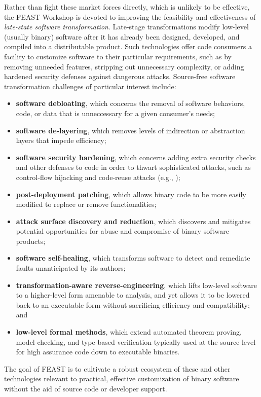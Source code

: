 \documentclass[sigconf]{acmart}
\begin{document}
Rather than fight these market forces directly, which is unlikely to be effective,
the FEAST Workshop is devoted to improving the feasibility and effectiveness of \emph{late-state software transformation}.
Late-stage transformations modify low-level (usually binary) software after it has already been designed, developed, and compiled into a distributable product.
Such technologies offer code consumers a facility to customize software to their particular requirements, such as by removing unneeded features, stripping out unnecessary complexity, or adding hardened security defenses against dangerous attacks.
Source-free software transformation challenges of particular interest include:
\begin{itemize}[itemsep=.5ex plus1pt minus0pt]
  \item \textbf{software debloating}, which concerns the removal of software behaviors, code, or data that is unneccessary for a given consumer's needs;
  \item \textbf{software de-layering}, which removes levels of indirection or abstraction layers that impede efficiency;
  \item \textbf{software security hardening}, which concerns adding extra security checks and other defenses to code in order to thwart sophisticated attacks, such as control-flow hijacking and code-reuse attacks (e.g., \cite{rop});
  \item \textbf{post-deployment patching}, which allows binary code to be more easily modified to replace or remove functionalities;
  \item \textbf{attack surface discovery and reduction}, which discovers and mitigates potential opportunities for abuse and compromise of binary software products;
  \item \textbf{software self-healing}, which transforms software to detect and remediate faults unanticipated by its authors;
  \item \textbf{transformation-aware reverse-engineering}, which lifts low-level software to a higher-level form amenable to analysis, and yet allows it to be lowered back to an executable form without sacrificing efficiency and compatibility; and
  \item \textbf{low-level formal methods}, which extend automated theorem proving, model-checking, and type-based verification typically used at the source level for high assurance code down to executable binaries.
\end{itemize}

The goal of FEAST is to cultivate a robust ecosystem of these and other technologies relevant to practical, effective customization of binary software without the aid of source code or developer support.
\end{document}
